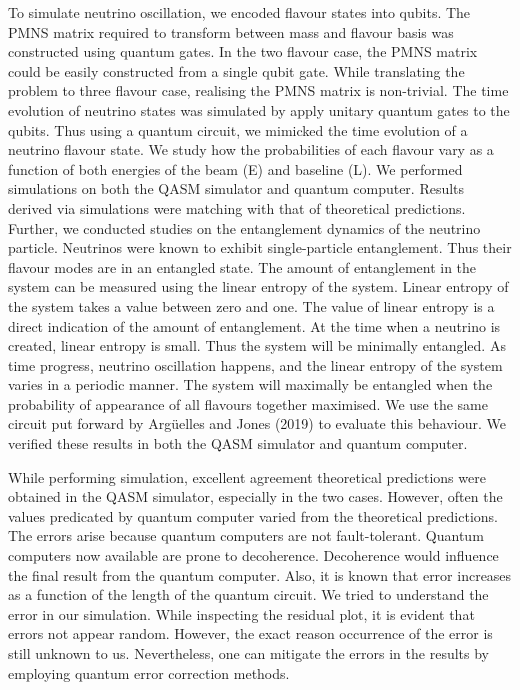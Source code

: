 \documentclass[12pt,a4paper]{report}
\begin{document}
To simulate neutrino oscillation, we encoded flavour states into qubits. The PMNS matrix required to transform between mass and flavour basis was constructed using quantum gates. In the two flavour case, the PMNS matrix could be easily constructed from a single qubit gate. While translating the problem to three flavour case, realising the PMNS matrix is non-trivial. The time evolution of neutrino states was simulated by apply unitary quantum gates to the qubits. Thus using a quantum circuit, we mimicked the time evolution of a neutrino flavour state. We study how the probabilities of each flavour vary as a function of both energies of the beam (E) and baseline (L). We performed simulations on both the QASM simulator and quantum computer. Results derived via simulations were matching with that of theoretical predictions.
Further, we conducted studies on the entanglement dynamics of the neutrino particle. Neutrinos were known to exhibit single-particle entanglement. Thus their flavour modes are in an entangled state. The amount of entanglement in the system can be measured using the linear entropy of the system. Linear entropy of the system takes a value between zero and one. The value of linear entropy is a direct indication of the amount of entanglement.  At the time when a neutrino is created, linear entropy is small. Thus the system will be minimally entangled. As time progress, neutrino oscillation happens, and the linear entropy of the system varies in a periodic manner. The system will maximally be entangled when the probability of appearance of all flavours together maximised.  We use the same circuit put forward by Arg\"uelles and Jones (2019) to evaluate this behaviour.  We verified these results in both the QASM simulator and quantum computer.\par
While performing simulation, excellent agreement theoretical predictions were obtained in the QASM simulator, especially in the two cases. However, often the values predicated by quantum computer varied from the theoretical predictions. The errors arise because quantum computers are not fault-tolerant. Quantum computers now available are prone to decoherence. Decoherence would influence the final result from the quantum computer. Also, it is known that error increases as a function of the length of the quantum circuit. We tried to understand the error in our simulation. While inspecting the residual plot, it is evident that errors not appear random. However, the exact reason occurrence of the error is still unknown to us. Nevertheless, one can mitigate the errors in the results by employing quantum error correction methods.
\end{document}
